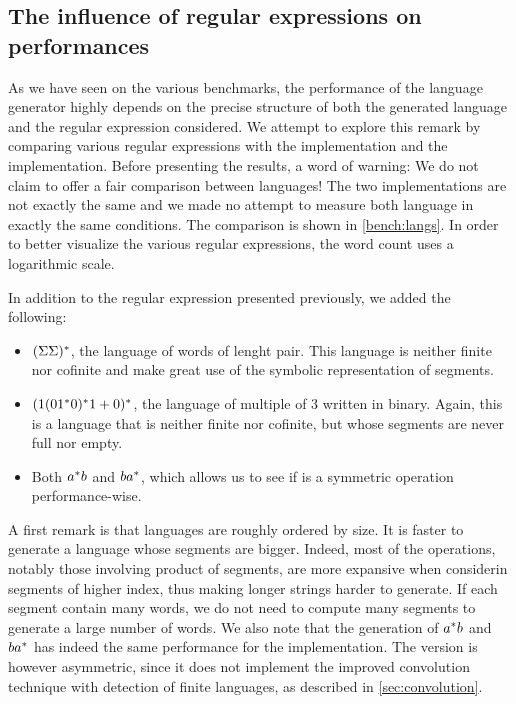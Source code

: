 \subsection{The influence of regular expressions on performances}

As we have seen on the various benchmarks, the performance of the language
generator highly depends on the precise structure of both
the generated language and the regular expression considered.
We attempt to explore this remark by comparing various regular expressions
with the  \haskell implementation and the 
\ocaml implementation.
Before presenting the results, a word of warning:
We do not claim to offer a fair comparison between languages!
The two implementations are not exactly the same and we made no attempt
to measure both language in exactly the same conditions.
The comparison is shown in \cref{bench:langs}. In order to better visualize the
various regular expressions, the word count uses a logarithmic scale.

In addition to the regular expression presented previously, we added the following:
\begin{itemize}
\item $(\Sigma\Sigma)^*$, the language of words of lenght pair. This language
  is neither finite nor cofinite and make great use of the symbolic
  representation of segments.
\item $(1 (01^*0)^*1 +{0})^*$, the language
  of multiple of 3 written in binary. Again, this is a language that is neither
  finite nor cofinite, but whose segments are never full nor empty.
\item Both $a^*b$ and $ba^*$, which allows us to see if
   is a symmetric operation performance-wise.
\end{itemize}

A first remark is that languages are roughly ordered by size. It is faster
to generate a language whose segments are bigger. Indeed,
most of the operations, notably
those involving product of segments, are more expansive when considerin
segments of higher index, thus making longer strings harder to generate.
If each segment contain many words, we do not need to compute many segments to
generate a large number of words.
%
We also note that the generation of $a^*b$ and $ba^*$
has indeed the same performance for the \haskell implementation.
The \ocaml version is however asymmetric, since it does not implement
the improved convolution technique with
detection of finite languages, as described in \cref{sec:convolution}.


